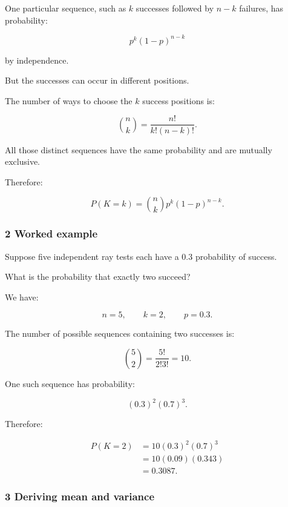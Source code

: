One particular sequence, such as \(k\) successes followed by \(n-k\) failures, has probability:

\[
 p^k(1-p)^{n-k}
\]

by independence.

But the successes can occur in different positions.

The number of ways to choose the \(k\) success positions is:

\[
 \binom nk= \frac{n!}{k!(n-k)!}.
\]

All those distinct sequences have the same probability and are mutually exclusive.

Therefore:

\[
 \boxed{ P(K=k) = \binom nkp^k(1-p)^{n-k} }.
\]

\begin{allmightroleexample}

\subsubsection{2 Worked example}\label{02-foundations-ii-ch023-worked-example}

\hypertarget{02-foundations-ii-ch023-worked-example}{}

Suppose five independent ray tests each have a \(0.3\) probability of success.

\end{allmightroleexample}

What is the probability that exactly two succeed?

We have:

\[
 n=5,\qquad k=2,\qquad p=0.3.
\]

The number of possible sequences containing two successes is:

\[
 \binom52=\frac{5!}{2!3!}=10.
\]

One such sequence has probability:

\[
 (0.3)^2(0.7)^3.
\]

Therefore:

\[
 \begin{aligned} P(K=2) &=10(0.3)^2(0.7)^3\\ &=10(0.09)(0.343)\\ &=\boxed{0.3087}. \end{aligned}
\]

\subsubsection{3 Deriving mean and variance}\label{02-foundations-ii-ch023-deriving-mean-and-variance}

